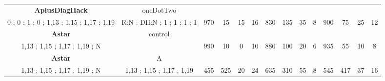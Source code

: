 \begin{table}[]
{\begin{tabular}{|c|c|c|c|c|c|c|c|c|c|c|c|c|c|}
\cellcolor{blue!15}\textbf{AplusDiagHack} & oneDotTwo& {\color[HTML]{00009B} } & {\color[HTML]{9A0000} } & {\color[HTML]{009901} } &  & {\color[HTML]{00009B} } & {\color[HTML]{9A0000} } & {\color[HTML]{009901} } &  & {\color[HTML]{00009B} } & {\color[HTML]{9A0000} } & {\color[HTML]{009901} } &  \\ 
\cellcolor{ blue!15}0 ; 0 ; 1 ; 0 ; 1,13 ; 1,15 ; 1,17 ; 1,19 & R:N ; DH:N ; 1 ; 1 ; 1 ; 1 & \multirow{-2}{*}{{\color[HTML]{00009B} 970}} & \multirow{-2}{*}{{\color[HTML]{9A0000} 15}} & \multirow{-2}{*}{{\color[HTML]{009901} 15}} & \multirow{-2}{*}{16} & \multirow{-2}{*}{{\color[HTML]{00009B} 830}} & \multirow{-2}{*}{{\color[HTML]{9A0000} 135}} & \multirow{-2}{*}{{\color[HTML]{009901} 35}} & \multirow{-2}{*}{8} & \multirow{-2}{*}{{\color[HTML]{00009B} 900}} & \multirow{-2}{*}{{\color[HTML]{9A0000} 75}} & \multirow{-2}{*}{{\color[HTML]{009901} 25}} & \multirow{-2}{*}{12} \\ \hline

\cellcolor{blue!15}\textbf{Astar} & control& {\color[HTML]{00009B} } & {\color[HTML]{9A0000} } & {\color[HTML]{009901} } &  & {\color[HTML]{00009B} } & {\color[HTML]{9A0000} } & {\color[HTML]{009901} } &  & {\color[HTML]{00009B} } & {\color[HTML]{9A0000} } & {\color[HTML]{009901} } &  \\ 
\cellcolor{ blue!15}1,13 ; 1,15 ; 1,17 ; 1,19 ; N &  & \multirow{-2}{*}{{\color[HTML]{00009B} 990}} & \multirow{-2}{*}{{\color[HTML]{9A0000} 10}} & \multirow{-2}{*}{{\color[HTML]{009901} 0}} & \multirow{-2}{*}{10} & \multirow{-2}{*}{{\color[HTML]{00009B} 880}} & \multirow{-2}{*}{{\color[HTML]{9A0000} 100}} & \multirow{-2}{*}{{\color[HTML]{009901} 20}} & \multirow{-2}{*}{6} & \multirow{-2}{*}{{\color[HTML]{00009B} 935}} & \multirow{-2}{*}{{\color[HTML]{9A0000} 55}} & \multirow{-2}{*}{{\color[HTML]{009901} 10}} & \multirow{-2}{*}{8} \\ \hline

\cellcolor{blue!15}\textbf{Astar} & A& {\color[HTML]{00009B} } & {\color[HTML]{9A0000} } & {\color[HTML]{009901} } &  & {\color[HTML]{00009B} } & {\color[HTML]{9A0000} } & {\color[HTML]{009901} } &  & {\color[HTML]{00009B} } & {\color[HTML]{9A0000} } & {\color[HTML]{009901} } &  \\ 
\cellcolor{ blue!15}1,13 ; 1,15 ; 1,17 ; 1,19 ; N & 1,13 ; 1,15 ; 1,17 ; 1,19 & \multirow{-2}{*}{{\color[HTML]{00009B} 455}} & \multirow{-2}{*}{{\color[HTML]{9A0000} 525}} & \multirow{-2}{*}{{\color[HTML]{009901} 20}} & \multirow{-2}{*}{24} & \multirow{-2}{*}{{\color[HTML]{00009B} 635}} & \multirow{-2}{*}{{\color[HTML]{9A0000} 310}} & \multirow{-2}{*}{{\color[HTML]{009901} 55}} & \multirow{-2}{*}{8} & \multirow{-2}{*}{{\color[HTML]{00009B} 545}} & \multirow{-2}{*}{{\color[HTML]{9A0000} 417}} & \multirow{-2}{*}{{\color[HTML]{009901} 37}} & \multirow{-2}{*}{16} \\ \hline


\end{tabular}}
\end{table}
